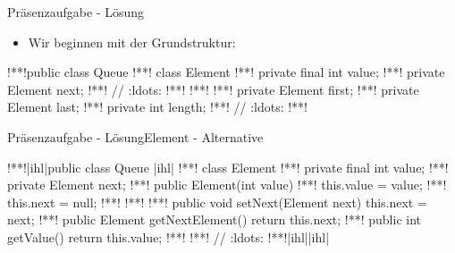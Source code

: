 \begin{frame}[fragile]{Präsenzaufgabe - Lösung\iffull\hfill\null\llap{\smash{\raisebox{-.3\baselineskip}{\scalebox{.7}{\itshape\footnotesize Or how to make \(\sim\)100 Lines Musterlösung verkraftbar}}}}\fi}
    \SetupLstHl
    \begin{itemize}[<+(1)->]
        \item Wir beginnen mit der Grundstruktur: 
    \end{itemize}
\begin{plainjava}
!**!public class Queue {
!**!    class Element {
!**!        private final int value;
!**!        private Element next;
!**!        // :ldots:
!**!    }
!**!
!**!    private Element first;
!**!    private Element last;
!**!    private int length;
!**!    // :ldots:
!**!}
\end{plainjava}
\end{frame}

\begin{frame}[c,fragile]{Präsenzaufgabe - Lösung\hfill Element - Alternative}
\lstset{lineskip=2.25pt}\SetupLstHl
\begin{plainjava}
!**!|ihl|public class Queue {|ihl|
!**!    class Element {
!**!        private final int value;
!**!        private Element next;
!**!        public Element(int value) {
!**!            this.value = value;
!**!            this.next = null;
!**!        }
!**!
!**!        public void setNext(Element next) { this.next = next; }
!**!        public Element getNextElement() { return this.next; }
!**!        public int getValue() { return this.value; }
!**!    }
!**!    // :ldots:
!**!|ihl|}|ihl|
\end{plainjava}
\end{frame}

